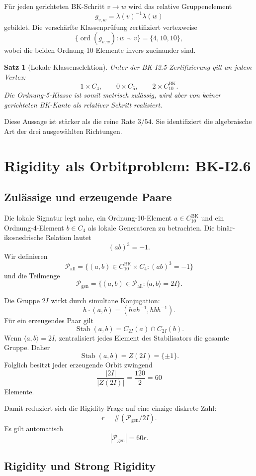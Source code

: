 \documentclass[11pt,a4paper]{article}
\newtheorem{satz}{Satz}[section]
\theoremstyle{definition}
\newcommand{\twoI}{2I}
\newcommand{\Pgen}{\mathcal P_{\mathrm{gen}}}
\newcommand{\Pall}{\mathcal P_{\mathrm{all}}}
\begin{document}
Für jeden gerichteten BK-Schritt \(v\to w\) wird das relative Gruppenelement
\[
g_{v,w}=\lambda(v)^{-1}\lambda(w)
\]
gebildet. Die verschärfte Klassenprüfung zertifiziert vertexweise
\[
\boxed{
\{\operatorname{ord}(g_{v,w}):w\sim v\}
=
\{4,10,10\},
}
\]
wobei die beiden Ordnung-10-Elemente invers zueinander sind.

\begin{satz}[Lokale Klassenselektion]
Unter der BK-I2.5-Zertifizierung gilt an jedem Vertex:
\[
1\times C_4,\qquad
0\times C_5,\qquad
2\times C_{10}^{\mathrm{BK}}.
\]
Die Ordnung-5-Klasse ist somit metrisch zulässig, wird aber von keiner gerichteten BK-Kante als relativer Schritt realisiert.
\end{satz}

Diese Aussage ist stärker als die reine Rate \(3/54\). Sie identifiziert die algebraische Art der drei ausgewählten Richtungen.

\section{Rigidity als Orbitproblem: BK-I2.6}

\subsection{Zulässige und erzeugende Paare}

Die lokale Signatur legt nahe, ein Ordnung-10-Element \(a\in C_{10}^{\mathrm{BK}}\) und ein Ordnung-4-Element \(b\in C_4\) als lokale Generatoren zu betrachten. Die binär-ikosaedrische Relation lautet
\[
(ab)^3=-1.
\]
Wir definieren
\[
\Pall=
\{(a,b)\in C_{10}^{\mathrm{BK}}\times C_4:(ab)^3=-1\}
\]
und die Teilmenge
\[
\Pgen=
\{(a,b)\in\Pall:\langle a,b\rangle=\twoI\}.
\]

Die Gruppe \(\twoI\) wirkt durch simultane Konjugation:
\[
h\cdot(a,b)
=
(hah^{-1},hbh^{-1}).
\]
Für ein erzeugendes Paar gilt
\[
\operatorname{Stab}(a,b)
=
C_{\twoI}(a)\cap C_{\twoI}(b).
\]
Wenn \(\langle a,b\rangle=\twoI\), zentralisiert jedes Element des Stabilisators die gesamte Gruppe. Daher
\[
\operatorname{Stab}(a,b)=Z(\twoI)=\{\pm1\}.
\]
Folglich besitzt jeder erzeugende Orbit zwingend
\[
\boxed{
\frac{|\twoI|}{|Z(\twoI)|}
=\frac{120}{2}
=60
}
\]
Elemente.

Damit reduziert sich die Rigidity-Frage auf eine einzige diskrete Zahl:
\[
r=\#(\Pgen/\twoI).
\]
Es gilt automatisch
\[
|\Pgen|=60r.
\]

\subsection{Rigidity und Strong Rigidity}
\end{document}
